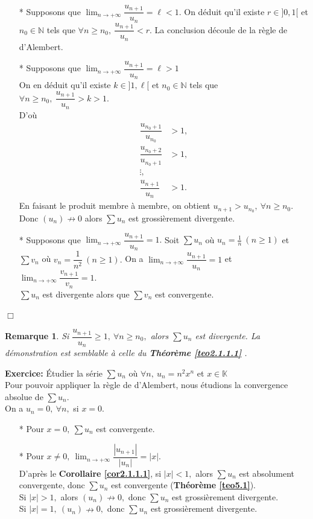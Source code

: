 \documentclass[11pt, a4paper]{book}
\newtheorem{rem}{Remarque}[section]
\newenvironment{pr}{\noindent {\bf Preuve} \noindent} {\hfill $\Box$\vskip 5mm}
\begin{document}
\begin{pr}\quad \begin{enumerate}
\item[*] Supposons que ${\displaystyle \lim_{n\rightarrow+\infty} \dfrac{u_{n+1}}{u_{n}}=\ell<1}$. On d\'eduit qu'il existe $r\in ]0,1[$ et $n_0 \in \mathbb{N}$ tels que $ \forall n \geq n_0,~ \dfrac{u_{n+1}}{u_n}<r.$ La conclusion d\'ecoule de la r\`egle de d'Alembert.
\item[*] Supposons que ${\displaystyle \lim_{n\rightarrow+\infty}\dfrac{u_{n+1}}{u_n}=\ell>1}$\\
On en d\'eduit qu'il existe $k \in ]1,\ell[$ et $n_0 \in \mathbb{N}$ tels que $\forall n \geq n_0,~ \dfrac{u_{n+1}}{u_n}>k>1.$\\ D'o\`u 
\begin{align*}\dfrac{u_{n_0 +1}}{u_{n_{0}}}&>1,\\ \dfrac{u_{n_0 +2}}{u_{n_0 +1}}&>1,\\ \vdots,\\ \dfrac{u_{n+1}}{u_n}&>1. 
\end{align*} En faisant le produit membre \`a membre, on obtient $u_{n+1}>u_{n_{0}},~ \forall n\geq n_0.$ Donc $(u_n)\nrightarrow 0$ alors $\sum u_n$ est grossi\`erement divergente.
\item[*] Supposons que ${\displaystyle \lim_{n\rightarrow+\infty}\dfrac{u_{n+1}}{u_n}=1.}$ Soit $\sum u_n$ o\`u $u_n=\frac{1}{n} ~(n\geq 1)$ et $\sum v_n$ o\`u $v_n=\dfrac{1}{n^2} ~(n\geq 1).$ On a ${\displaystyle \lim_{n\rightarrow+\infty}\dfrac{u_{n+1}}{u_n}=1}$ et ${\displaystyle \lim_{n\rightarrow+\infty}\dfrac{v_{n+1}}{v_n}=1.}$\\ $\sum u_n$ est divergente alors que $\sum v_n$ est convergente.
\end{enumerate}
\end{pr}
\begin{rem} Si $\dfrac{u_{n+1}}{u_n} \geq 1,~\forall n \geq n_0,$ alors $\sum u_n$ est divergente. La d\'emonstration est semblable \`a celle du \textbf{Th\'eor\`eme \ref{teo2.1.1.1} }. \end{rem}
\textbf{Exercice:} \quad \'Etudier la s\'erie $\sum u_n$ o\`u $\forall n,~ u_n=n^2 x^n$ et $x\in \mathbb{K}$\\
Pour pouvoir appliquer la r\`egle de d'Alembert, nous \'etudions la convergence absolue de $\sum u_n.$\\ On a $u_n=0,~\forall n,$ si $x=0.$\\ \begin{enumerate}
\item[*] Pour $x=0,~ \sum u_n$ est convergente.
\item[*] Pour $x\neq 0, ~ {\displaystyle \lim_{n\rightarrow+\infty}\dfrac{|u_{n+1}|}{|u_n|}=|x|.}$ \\ D'apr\`es le \textbf{Corollaire \ref{cor2.1.1.1}}, si $|x|<1,$ alors $\sum u_n$ est absolument convergente, donc $\sum u_n$ est convergente (\textbf{Th\'eor\`eme \ref{teo5.1}}).\\ Si $|x|>1,$ alors $(u_n)\nrightarrow0,$ donc $\sum u_n$ est grossi\`erement divergente.\\
Si $|x|=1, ~(u_n)\nrightarrow0,$ donc $\sum u_n$ est grossi\`erement divergente.
\end{enumerate} 
\end{document}
